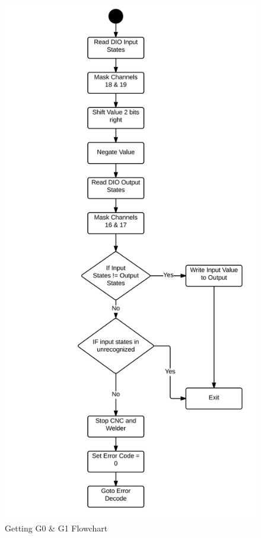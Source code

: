 \documentclass[12pt]{article}
\begin{document}
\begin{figure}[!h]
\centering
\includegraphics[scale=0.9]{getg0g1}
\caption{Getting G0 \& G1 Flowchart}
\end{figure}
\end{document}

